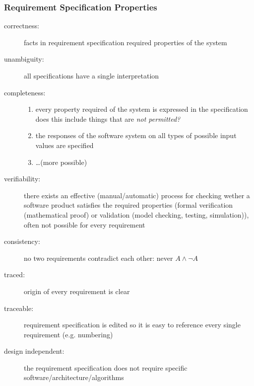 \documentclass[a4paper, 10pt]{article}
\begin{document}
\subsubsection{Requirement Specification Properties}
\begin{description}
	\item[correctness:] facts in requirement specification \follows required properties of the system
	\item[unambiguity:] all specifications have a single interpretation
	\item[completeness:] 
		\begin{enumerate}
			\item every property required of the system is expressed in the specification\\
			{\small does this include things that are \emph{not permitted?}}
			\item the responses of the software system on all types of possible input values are specified
			\item \dots {\small (more possible)}
		\end{enumerate}
	\item[verifiability:] there exists an effective (manual/automatic) process for checking wether a software product satisfies the required properties (formal verification (mathematical proof) or validation (model checking, testing, simulation)), often not possible for every requirement
	\item[consistency:] no two requirements contradict each other: never $A \wedge \neg A$
	\item[traced:] origin of every requirement is clear
	\item[traceable:] requirement specification is edited so it is easy to reference every single requirement (e.g. numbering)
	\item[design independent:] the requirement specification does not require specific software/architecture/algorithms
\end{description}
\end{document}
